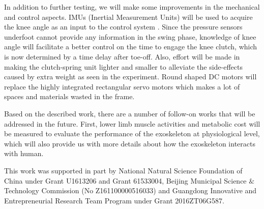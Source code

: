 \documentclass[twocolumn,cleanfoot,10pt]{asme2ej}
\begin{document}
In addition to further testing, we will make some improvements in the mechanical and control aspects. IMUs (Inertial Measurement Units) will be used to acquire the knee angle as an input to the control system \cite{IMU2}. Since the pressure sensors underfoot cannot provide any information in the swing phase, knowledge of knee angle will facilitate a better control on the time to engage the knee clutch, which is now determined by a time delay after toe-off. Also, effort will be made in making the clutch-spring unit lighter and smaller to alleviate the side-effects caused by extra weight as seen in the experiment. Round shaped DC motors will replace the highly integrated rectangular servo motors which makes a lot of spaces and materials wasted in the frame. 

Based on the described work, there are a number of follow-on works that will be addressed in the future. First, lower limb muscle activities and metabolic cost will be measured to evaluate the performance of the exoskeleton at physiological level, which will also provide us with more details about how the exoskeleton interacts with human. 

\begin{acknowledgment}
This work was supported in part by National Natural Science Foundation of China under Grant U1613206 and Grant 61533004, Beijing Municipal Science $\&$ Technology Commission (No Z161100000516033) and Guangdong Innovative and Entrepreneurial Research Team Program under Grant 2016ZT06G587.
\end{acknowledgment}

%



%


\clearpage
\listoffigures
\clearpage
\listoftables
\end{document}
